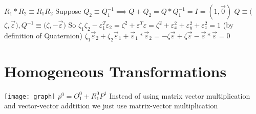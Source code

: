 \documentclass{article}
\begin{document}
\newline
\newline
$R_1*R_2 \equiv R_1R_2$
\newline
\newline
{}
\linebreak
\newline
Suppose  $Q_2 \equiv Q_1^{-1} \implies Q + Q_2 = Q * Q_1^{-1} = I = ( 1, \vec{0})$
\newline
$Q \equiv ($\space$\zeta, \vec{\varepsilon}$\space$),$\space$Q^{-1} \equiv ($\space$\zeta, -\vec{\varepsilon}$\space$)$
\newline
So $\zeta_1\zeta_2 - \varepsilon_1^T\varepsilon_2 = \zeta^2 + \varepsilon^T\varepsilon = \zeta^2 + \varepsilon_x^2 + \varepsilon_y^2 + \varepsilon_z^2 = 1$ (by definition of Quaternion)
\newline
$\zeta_1\vec{\varepsilon}_2 + \zeta_2\vec{\varepsilon}_1 + \vec{\varepsilon}_1*\vec{\varepsilon}_2 = - \zeta\vec{\varepsilon} + \zeta\vec{\varepsilon} - \vec{\varepsilon}*\vec{\varepsilon} = 0$

\section{Homogeneous Transformations}
\texttt{[image: graph]}
\newline
\newline
$p^0 = O_1^0 + R_1^0P^1$ 
\newline
Instead of using matrix vector multiplication and vector-vector addtition we just use matrix-vector multiplication
\end{document}
